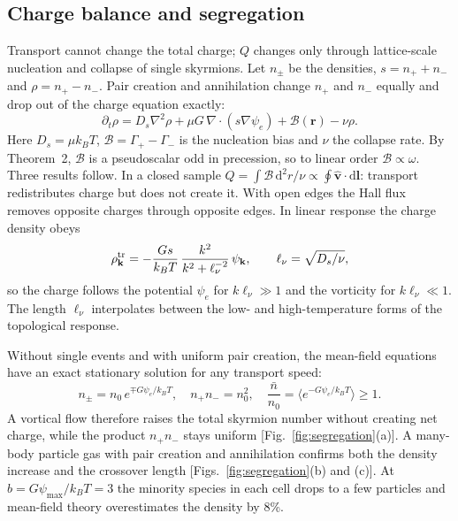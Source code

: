 \documentclass[aps,prb,twocolumn,superscriptaddress,longbibliography,floatfix]{revtex4-2}
\newcommand{\vv}{\mathbf v}
\newcommand{\vr}{\mathbf r}
\newcommand{\kT}{k_BT}
\newcommand{\dd}{\mathrm d}
\begin{document}
\subsection{Charge balance and segregation}

Transport cannot change the total charge; $Q$ changes only through lattice-scale nucleation and collapse of single skyrmions. Let $n_\pm$ be the densities, $s=n_++n_-$ and $\rho=n_+-n_-$. Pair creation and annihilation change $n_+$ and $n_-$ equally and drop out of the charge equation exactly:
\begin{equation}
\partial_t\rho=D_s\nabla^2\rho+\mu G\,\nabla\!\cdot\!(s\nabla\psi_e)+\mathcal B(\vr)-\nu\rho .
\label{eq:rate}
\end{equation}
Here $D_s=\mu\kT$, $\mathcal B=\Gamma_+-\Gamma_-$ is the nucleation bias and $\nu$ the collapse rate. By Theorem~2, $\mathcal B$ is a pseudoscalar odd in precession, so to linear order $\mathcal B\propto\omega$. Three results follow. In a closed sample $Q=\int\mathcal B\,\dd^2r/\nu\propto\oint\hat{\vv}\cdot\dd\mathbf l$: transport redistributes charge but does not create it. With open edges the Hall flux removes opposite charges through opposite edges. In linear response the charge density obeys
\begin{equation}
\rho^{\rm tr}_{\mathbf k}=-\frac{Gs}{\kT}\,\frac{k^2}{k^2+\ell_\nu^{-2}}\,\psi_{\mathbf k},\qquad \ell_\nu=\sqrt{D_s/\nu},
\label{eq:crossover}
\end{equation}
so the charge follows the potential $\psi_e$ for $k\ell_\nu\gg1$ and the vorticity for $k\ell_\nu\ll1$. The length $\ell_\nu$ interpolates between the low- and high-temperature forms of the topological response.

Without single events and with uniform pair creation, the mean-field equations have an exact stationary solution for any transport speed:
\begin{equation}
n_\pm=n_0\,e^{\mp G\psi_e/\kT},\quad n_+n_-=n_0^2,\quad \frac{\bar n}{n_0}=\big\langle e^{-G\psi_e/\kT}\big\rangle\ge1 .
\label{eq:segregation}
\end{equation}
A vortical flow therefore raises the total skyrmion number without creating net charge, while the product $n_+n_-$ stays uniform [Fig.~\ref{fig:segregation}(a)]. A many-body particle gas with pair creation and annihilation confirms both the density increase and the crossover length [Figs.~\ref{fig:segregation}(b) and (c)]. At $b=G\psi_{\max}/\kT=3$ the minority species in each cell drops to a few particles and mean-field theory overestimates the density by 8\%.
\end{document}
